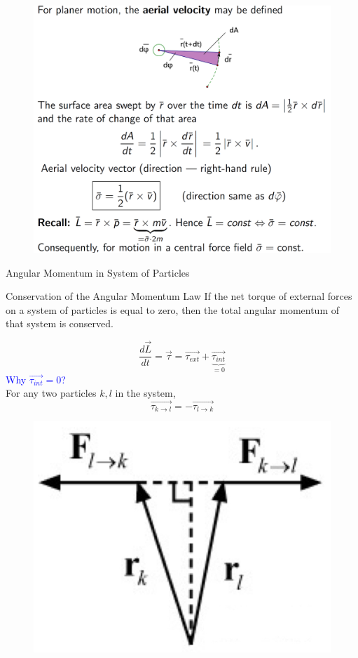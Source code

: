 \documentclass{beamer}
\begin{document}
\begin{frame}
  \begin{figure}[htbp]
  \centering
  \includegraphics[width=0.78 \linewidth, angle =0]{Aerial.png}
  \label{fig:1}
  \end{figure}
\end{frame}

\begin{frame}{Angular Momentum in System of Particles}
  \begin{block}{Conservation of the Angular Momentum Law}
    If the net torque of external forces on a system of particles is equal to zero, then the total angular momentum of that system is conserved.
  \end{block}\pause
  $$\frac{d\vec{L}}{dt} = \vec{\tau} = \vec{\tau_{ext}} + \underbrace{\vec{\tau_{int}}}_{= 0}$$\pause
  \textcolor{blue}{Why $ \vec{\tau_{int}}= 0$?} \\
  For any two particles $k, l$ in the system,
  $$\vec{\tau_{k\rightarrow l}} = -\vec{\tau_{l\rightarrow k}}$$
  \begin{figure}[htbp]
  \centering
  \includegraphics[width=0.15 \linewidth, angle =0]{prove.png}
  \label{fig:2}
  \end{figure}
\end{frame}
\end{document}
